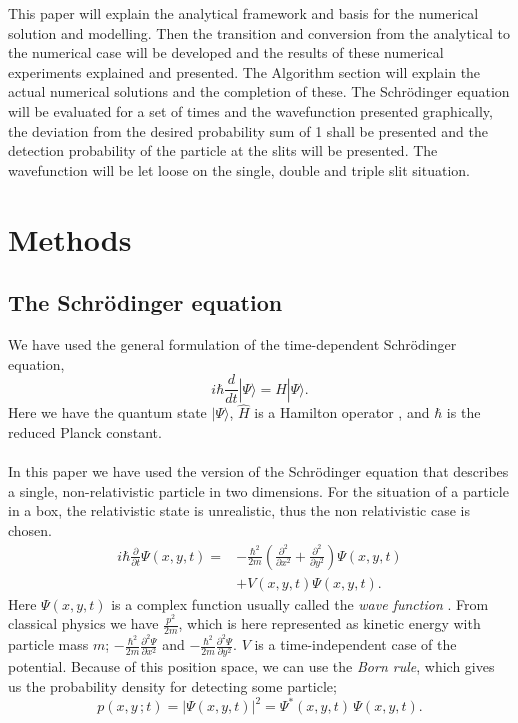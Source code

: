 \documentclass[english,notitlepage,reprint,nofootinbib]{revtex4-1}  %
\begin{document}
	This paper will explain the analytical framework and basis for the numerical solution and modelling. Then the transition and conversion from the analytical to the numerical case will be developed and the results of these numerical experiments explained and presented. The Algorithm section will explain the actual numerical solutions and the completion of these. The Schrödinger equation will be evaluated for a set of times and the wavefunction presented graphically, the deviation from the desired probability sum of 1 shall be presented and the detection probability of the particle at the slits will be presented. The wavefunction will be let loose on the single, double and triple slit situation. 
	
	\section{Methods}\label{sec:methods}
	
	\subsection{The Schrödinger equation}
	
	We have used the general formulation of the time-dependent Schrödinger equation,
	\begin{equation}
		i \hbar \frac{d}{dt} |\Psi\rangle = \hat{H} |\Psi\rangle.
	\end{equation}
	Here we have the quantum state $|\Psi\rangle$, $\hat{H}$ is a Hamilton operator \cite{comphys_assign}, and $\hbar$ is the reduced Planck constant.
	\\
	\\
	
	In this paper we have used the version of the Schrödinger equation that describes a single, non-relativistic particle in two dimensions. For the situation of a particle in a box, the relativistic state is unrealistic, thus the non relativistic case is chosen. 
	\begin{equation} \label{eq:wave}
		\begin{split}
			i \hbar \frac{\partial}{\partial t} \Psi(x,y,t) = & -\frac{\hbar^2}{2m} \left( \frac{\partial^2}{\partial x^2} + \frac{\partial^2}{\partial y^2} \right) \Psi(x,y,t) \\
			& + V(x,y,t) \Psi(x,y,t).
		\end{split}
	\end{equation}
	Here $\Psi(x,y,t)$ is a complex function usually called the \textit{wave function} \cite{comphys_assign}. From classical physics we have $\frac{p^2}{2m}$, which is here represented as kinetic energy with particle mass $m$; $-\frac{\hbar^2}{2m} \frac{\partial^2 \Psi}{\partial x^2}$ and $-\frac{\hbar^2}{2m} \frac{\partial^2 \Psi}{\partial y^2}$. $V$ is a time-independent case of the potential. Because of this position space, we can use the \textit{Born rule}, which gives us the probability density for detecting some particle; 
	\begin{equation} \label{eq:Born}
		p(x,y\,;t) = |\Psi(x,y,t)|^2 = \Psi^*(x,y,t) \, \Psi(x,y,t).
	\end{equation}
	
\end{document}
